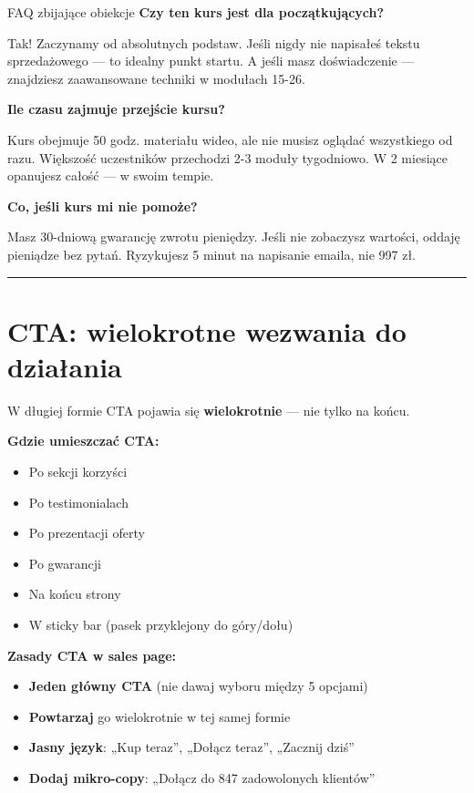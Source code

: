 \documentclass[
  12pt,
  a4paper,
  twoside,
  openright,
  12pt,
  DIV=12,
  BCOR=12mm]{scrbook}
\providecommand{\tightlist}{%
  \setlength{\itemsep}{0pt}\setlength{\parskip}{0pt}}\usepackage{longtable,booktabs,array}
\newcommand{\decoline}{%
  \begin{center}
    \textcolor{bordergray}{\rule{0.3\textwidth}{0.5pt}}
  \end{center}
}
\begin{document}
\begin{przyklad}{FAQ zbijające obiekcje}
\textbf{Czy ten kurs jest dla początkujących?}

Tak! Zaczynamy od absolutnych podstaw. Jeśli nigdy nie napisałeś tekstu sprzedażowego --- to idealny punkt startu. A jeśli masz doświadczenie --- znajdziesz zaawansowane techniki w modułach 15-26.

\textbf{Ile czasu zajmuje przejście kursu?}

Kurs obejmuje 50 godz. materiału wideo, ale nie musisz oglądać wszystkiego od razu. Większość uczestników przechodzi 2-3 moduły tygodniowo. W 2 miesiące opanujesz całość --- w swoim tempie.

\textbf{Co, jeśli kurs mi nie pomoże?}

Masz 30-dniową gwarancję zwrotu pieniędzy. Jeśli nie zobaczysz wartości, oddaję pieniądze bez pytań. Ryzykujesz 5 minut na napisanie emaila, nie 997 zł.
\end{przyklad}

\decoline

\section{CTA: wielokrotne wezwania do
działania}\label{cta-wielokrotne-wezwania-do-dziaux142ania}

W długiej formie CTA pojawia się \textbf{wielokrotnie} --- nie tylko na
końcu.

\textbf{Gdzie umieszczać CTA:}

\begin{itemize}
\tightlist
\item
  Po sekcji korzyści
\item
  Po testimonialach
\item
  Po prezentacji oferty
\item
  Po gwarancji
\item
  Na końcu strony
\item
  W sticky bar (pasek przyklejony do góry/dołu)
\end{itemize}

\textbf{Zasady CTA w sales page:}

\begin{itemize}
\tightlist
\item
  \textbf{Jeden główny CTA} (nie dawaj wyboru między 5 opcjami)
\item
  \textbf{Powtarzaj} go wielokrotnie w tej samej formie
\item
  \textbf{Jasny język}: „Kup teraz'', „Dołącz teraz'', „Zacznij dziś''
\item
  \textbf{Dodaj mikro-copy}: „Dołącz do 847 zadowolonych klientów''
\end{itemize}
\end{document}
